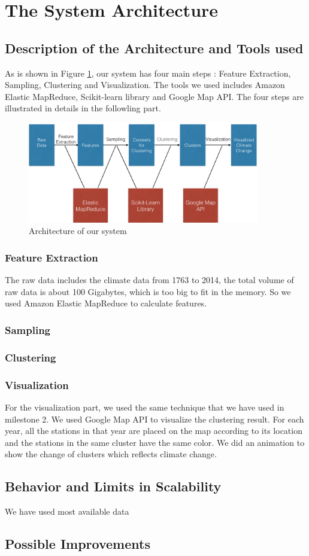 \section{The System Architecture}

\subsection{Description of the Architecture and Tools used}
As is shown in Figure \ref{fig:archi}, our system has four main steps : Feature Extraction, Sampling, Clustering and Visualization. The tools we used includes Amazon Elastic MapReduce, Scikit-learn library and Google Map API. The four steps are illustrated in details in the followling part.
\begin{figure}[htbp]
				\centering
				\includegraphics[width=0.9\textwidth]{figure/architecture.png}
				\caption{Architecture of our system}
				\label{fig:archi}
 \end{figure}
\subsubsection{Feature Extraction}
The raw data includes the climate data from 1763 to 2014, the total volume of raw data is about 100 Gigabytes, which is too big to fit in the memory. So we used Amazon Elastic MapReduce to calculate features.
\subsubsection{Sampling}

\subsubsection{Clustering}

\subsubsection{Visualization}
For the visualization part, we used the same technique that we have used in milestone 2. We used Google Map API to visualize the clustering result. For each year, all the stations in that year are placed on the map according to its location and the stations in the same cluster have the same color. We did an animation to show the change of clusters which reflects climate change.

\subsection{Behavior and Limits in Scalability}
We have used most available data
\subsection{Possible Improvements}
